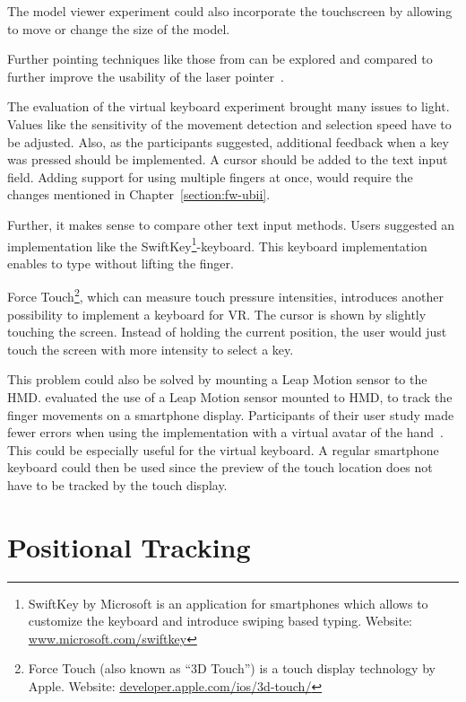 The model viewer experiment could also incorporate the touchscreen by allowing to move or change the size of the model.

Further pointing techniques like those from \citeauthor{Argelaguet.2013} can be explored and compared to further improve the usability of the laser pointer~\cite[123]{Argelaguet.2013}.

The evaluation of the virtual keyboard experiment brought many issues to light. 
Values like the sensitivity of the movement detection and selection speed have to be adjusted. Also, as the participants suggested, additional feedback when a key was pressed should be implemented. A cursor should be added to the text input field. Adding support for using multiple fingers at once, would require the changes mentioned in Chapter~\ref{section:fw-ubii}.

Further, it makes sense to compare other text input methods. Users suggested an implementation like the SwiftKey\footnote{SwiftKey by Microsoft is an application for smartphones which allows to customize the keyboard and introduce swiping based typing. Website: \href{https://www.microsoft.com/swiftkey}{www.microsoft.com/swiftkey}}-keyboard. This keyboard implementation enables to type without lifting the finger. 

Force Touch\footnote{Force Touch (also known as \enquote{3D Touch}) is a touch display technology by Apple. Website: \href{https://developer.apple.com/ios/3d-touch/}{developer.apple.com/ios/3d-touch/}}, which can measure touch pressure intensities, introduces another possibility to implement a keyboard for \ac{VR}. The cursor is shown by slightly touching the screen. Instead of holding the current position, the user would just touch the screen with more intensity to select a key. 

This problem could also be solved by mounting a Leap Motion sensor to the \ac{HMD}. \citeauthor{Afonso.2017} evaluated the use of a Leap Motion sensor mounted to \ac{HMD}, to track the finger movements on a smartphone display. Participants of their user study made fewer errors when using the implementation with a virtual avatar of the hand~\cite[247\psq]{Afonso.2017}. This could be especially useful for the virtual keyboard. A regular smartphone keyboard could then be used since the preview of the touch location does not have to be tracked by the touch display.



\section{Positional Tracking}\label{section:fw-positional-tracking}

